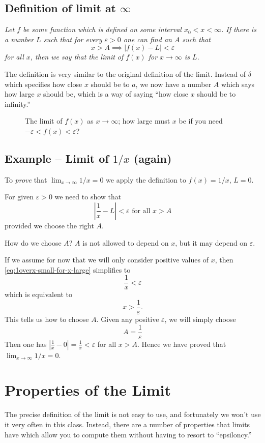\subsection{Definition of limit at $\infty$}
\itshape
Let $f$ be some function which is defined on some interval $x_0<x<\infty$.
If there is a number $L$ such that for every $\varepsilon>0$ one can find
an $A$ such that
\[
x>A \implies |f(x) - L| <\varepsilon
\]
for all $x$, then we say that the limit of $f(x)$ for $x\to\infty$ is $L$.
\upshape

The definition is very similar to the original definition of the limit.
Instead of $\delta$ which specifies how close $x$ should be to $a$, we now
have a number $A$ which says how large $x$ should be, which is a way of
saying ``how close $x$ should be to infinity.''

\begin{figure}[ht]
  \centering
  

  
  \caption{The limit of $f(x)$ as $x\to\infty$; how large must $x$ be
    if you need $-\varepsilon < f(x) < \varepsilon$?}
  \label{fig:limit-of-xinv-at-infty}
\end{figure}
\subsection{Example -- Limit of $1/x$ (again)}
\label{ex:lim1overx-at-infty-proved}
To \emph{prove} that $\lim_{x\to\infty}1/x = 0$ we apply the definition to
$f(x) = 1/x$, $L=0$.

For given $\varepsilon>0$ we need to show that
\begin{equation}\label{eq:1overx-small-for-x-large}
  \left|\frac1x - L\right|<\varepsilon \text{ for all } x>A
\end{equation}
provided we choose the right $A$.

How do we choose $A$?  $A$ is not allowed to depend on $x$, but it may
depend on $\varepsilon$.

If we assume for now that we will only consider positive values of $x$,
then \eqref{eq:1overx-small-for-x-large} simplifies to
\[
\frac 1x<\varepsilon
\]
which is equivalent to
\[
x>\frac1\varepsilon.
\]
This tells us how to choose $A$.  Given any positive $\varepsilon$, we will
simply choose
\[
A=\frac1\varepsilon
\]
Then one has $|\frac1x-0| = \frac1x <\varepsilon$ for all $x>A$.  Hence we
have proved that $\lim_{x\to\infty}1/x=0$.


\section{Properties of the Limit}
\label{sec:limitProperties}%
The precise definition of the limit is not easy to use, and
fortunately we won't use it very often in this class.  Instead, there
are a number of properties that limits have which allow you to compute
them without having to resort to ``epsiloncy.''

